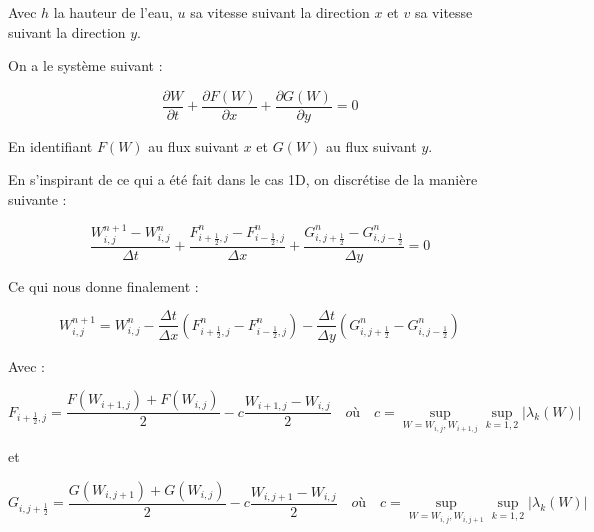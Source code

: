 \documentclass[
11pt, %
francais, %
singlespacing, %
headsepline, %
]{MastersDoctoralThesis} %
\theoremstyle{definition}
\begin{document}
Avec \(h\) la hauteur de l'eau, \(u\) sa vitesse suivant la direction
\(x\) et \(v\) sa vitesse suivant la direction \(y\).

On a le système suivant :

\[ \frac{\partial W}{\partial t} + \frac{\partial F(W)}{\partial x} + \frac{\partial G(W)}{\partial y} = 0 \]

En identifiant \(F(W)\) au flux suivant \(x\) et \(G(W)\) au flux
suivant \(y\).

En s'inspirant de ce qui a été fait dans le cas 1D, on discrétise de la
manière suivante :

\[ \frac{ W_{i,j}^{n+1} - W_{i,j}^{n} }{\Delta t} + \frac{ F_{i+\frac{1}{2},j}^{n} -  F_{i-\frac{1}{2},j}^{n} }{\Delta x} + \frac{G_{i,j+\frac{1}{2}}^{n} -  G_{i,j-\frac{1}{2}}^{n} }{\Delta y} = 0 \]

Ce qui nous donne finalement :

\[  W_{i,j}^{n+1} = W_{i,j}^n - \frac{\Delta t}{\Delta x} ( F_{i+\frac{1}{2},j}^{n} -  F_{i-\frac{1}{2},j}^{n} ) - \frac{\Delta t}{\Delta y} ( G_{i,j+\frac{1}{2}}^{n} -  G_{i,j-\frac{1}{2}}^{n} ) \]

Avec :

\[ F_{i+\frac{1}{2},j} =  \frac{ F(W_{i+1,j}) + F(W_{i,j}) }{2} - c \frac{ W_{i+1,j} - W_{i,j} }{2} \quad où \quad c = \sup_{W =  W_{i,j} ,  W_{i+1,j}} \sup_{k = 1,2} | \lambda _k(W) | \]

et

\[ G_{i,j+\frac{1}{2}} =  \frac{ G(W_{i,j+1}) + G(W_{i,j}) }{2} - c \frac{ W_{i,j+1} - W_{i,j} }{2} \quad où \quad c = \sup_{W =  W_{i,j} ,  W_{i,j+1}} \sup_{k = 1,2} | \lambda _k(W) | \]
\end{document}

